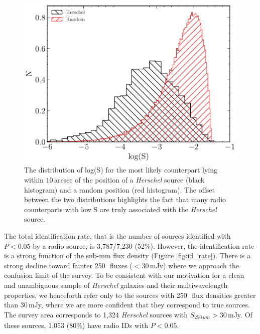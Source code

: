 \begin{figure}
	\centering
	\includegraphics[width=0.75\columnwidth]{Figures/ds_distributions.pdf}
	\caption[Distribution of log(S) for \textit{Herschel} sources and random positions]{The distribution of log(S) for the most likely counterpart lying within $10\,$arcsec of the position of a \textit{Herschel} source (black histogram) and a random position (red histogram). The offset between the two distributions highlights the fact that many radio counterparts with low S are truly associated with the \textit{Herschel} source.}
	\label{fig:ds_distributions}
\end{figure}

The total identification rate, that is the number of sources identified with $P < 0.05$ by a radio source, is 3,787/7,230 (52\%). However, the identification rate is a strong function of the sub-mm flux density (Figure \ref{fig:id_rate}). There is a strong decline toward fainter 250\,\micron\ fluxes ($< 30\,$mJy) where we approach the confusion limit of the survey. To be consistent with our motivation for a clean and unambiguous sample of \textit{Herschel} galaxies and their multiwavelength properties, we henceforth refer only to the sources with 250\,\micron\ flux densities greater than 30\,mJy, where we are more confident that they correspond to true sources. The survey area corresponds to 1,324 \textit{Herschel} sources with $S_{250\,\mu m} > 30\,$mJy. Of these sources, 1,053 (80\%) have radio IDs with $P < 0.05$.

